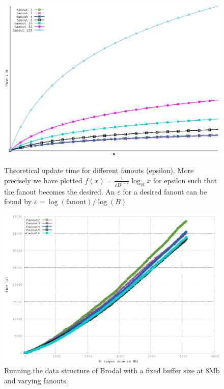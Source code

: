 \documentclass[twoside,11pt,openright]{report}
\def \epsilon {\varepsilon}
\begin{document}
\begin{figure}[htp]
\centering
\includegraphics[width=\textwidth]{../plots/gerth_update_epsilon/gerth_epsilon}
\caption{Theoretical update time for different fanouts (epsilon). More precisely we have plotted $f(x) = \frac{1}{\epsilon B^{1-\epsilon}} \log_B x$ for epsilon such that the fanout becomes the desired. An $\epsilon$ for a desired fanout can be found by $\epsilon = \log(\text{fanout})/\log(B)$}
\label{fig:gerth_fanout_theory}

\includegraphics[width=\textwidth]{../src/experiments/gerth_fanout_experiment_results/2016-05-06.11_52_24/time}
\caption{Running the data structure of Brodal with a fixed buffer size at 8Mb and varying fanouts.}
\label{fig:gerth_fanout_experiment}
\end{figure}
\end{document}
